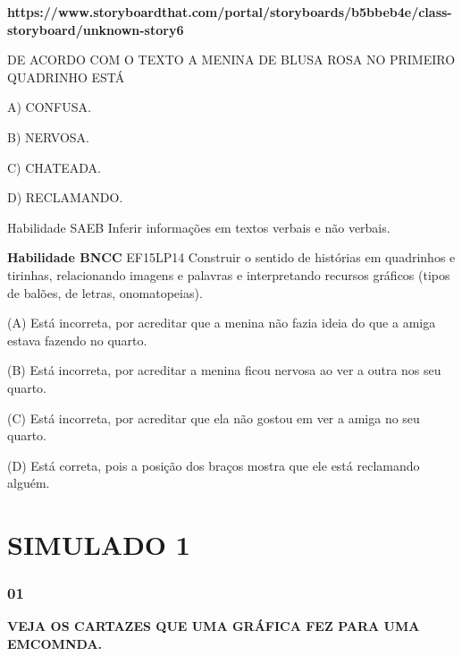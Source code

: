 \textbf{https://www.storyboardthat.com/portal/storyboards/b5bbeb4e/class-storyboard/unknown-story6}

DE ACORDO COM O TEXTO A MENINA DE BLUSA ROSA NO PRIMEIRO QUADRINHO ESTÁ

A) CONFUSA.

B) NERVOSA.

C) CHATEADA.

D) RECLAMANDO.

Habilidade SAEB Inferir informações em textos verbais e não verbais.

\textbf{Habilidade BNCC} EF15LP14 Construir o sentido de histórias em
quadrinhos e tirinhas, relacionando imagens e palavras e interpretando
recursos gráficos (tipos de balões, de letras, onomatopeias).

(A) Está incorreta, por acreditar que a menina não fazia ideia do que a
amiga estava fazendo no quarto.

(B) Está incorreta, por acreditar a menina ficou nervosa ao ver a outra
nos seu quarto.

(C) Está incorreta, por acreditar que ela não gostou em ver a amiga no
seu quarto.

(D) Está correta, pois a posição dos braços mostra que ele está
reclamando alguém.

\section{SIMULADO 1}\label{simulado-1}

\subsubsection{01}\label{section-26}

\textbf{VEJA OS CARTAZES QUE UMA GRÁFICA FEZ PARA UMA EMCOMNDA.}

